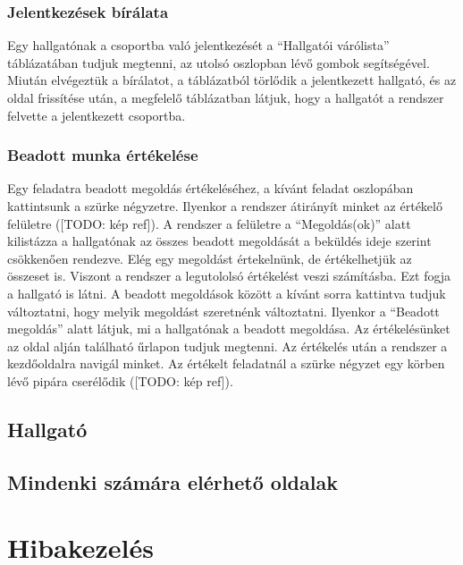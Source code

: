 \subsubsection{Jelentkezések bírálata}
\label{step:instructor-pending}
Egy hallgatónak a csoportba való jelentkezését a ``Hallgatói várólista'' táblázatában tudjuk megtenni, az utolsó oszlopban lévő gombok segítségével. Miután elvégeztük a bírálatot, a táblázatból törlődik a jelentkezett hallgató, és az oldal frissítése után, a megfelelő táblázatban látjuk, hogy a hallgatót a rendszer felvette a jelentkezett csoportba.
\subsubsection{Beadott munka értékelése}
\label{step:instructor-eval}
Egy feladatra beadott megoldás értékeléséhez, a kívánt feladat oszlopában kattintsunk a szürke négyzetre. Ilyenkor a rendszer átirányít minket az értékelő felületre ([TODO: kép ref]). A rendszer a felületre a ``Megoldás(ok)'' alatt kilistázza a hallgatónak az összes beadott megoldását a beküldés ideje szerint csökkenően rendezve. Elég egy megoldást értekelnünk, de értékelhetjük az összeset is. Viszont a rendszer a legutololsó értékelést veszi számításba. Ezt fogja a hallgató is látni. A beadott megoldások között a kívánt sorra kattintva tudjuk változtatni, hogy melyik megoldást szeretnénk változtatni. Ilyenkor a ``Beadott megoldás'' alatt látjuk, mi a hallgatónak a beadott megoldása. Az értékelésünket az oldal alján található űrlapon tudjuk megtenni. Az értékelés után a rendszer a kezdőoldalra navigál minket. Az értékelt feladatnál a szürke négyzet egy körben lévő pipára cserélődik ([TODO: kép ref]).
\subsection{Hallgató}
\label{step:student-role}

\subsection{Mindenki számára elérhető oldalak}
\label{step:mindenkinek-elerheto-oldal}
\section{Hibakezelés}